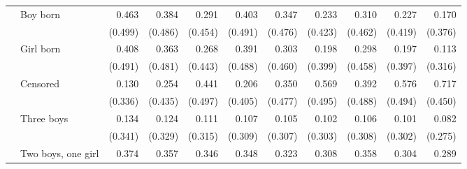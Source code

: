 \begin{table}
\begin{center}
\begin{scriptsize}
\begin{threeparttable}
\begin{tabular} {@{} c l D{.}{.}{1.3} D{.}{.}{1.3} D{.}{.}{1.3} D{.}{.}{1.3} D{.}{.}{1.3} D{.}{.}{1.3} D{.}{.}{1.3} D{.}{.}{1.3} D{.}{.}{1.3} @{}}
\addlinespace
\midrule
{}
                    & Boy born            &       0.463         &       0.384         &       0.291         &       0.403         &       0.347         &       0.233         &       0.310         &       0.227         &       0.170         \\
                    &                     &     (0.499)         &     (0.486)         &     (0.454)         &     (0.491)         &     (0.476)         &     (0.423)         &     (0.462)         &     (0.419)         &     (0.376)         \\
                    & Girl born           &       0.408         &       0.363         &       0.268         &       0.391         &       0.303         &       0.198         &       0.298         &       0.197         &       0.113         \\
                    &                     &     (0.491)         &     (0.481)         &     (0.443)         &     (0.488)         &     (0.460)         &     (0.399)         &     (0.458)         &     (0.397)         &     (0.316)         \\
                    & Censored            &       0.130         &       0.254         &       0.441         &       0.206         &       0.350         &       0.569         &       0.392         &       0.576         &       0.717         \\
                    &                     &     (0.336)         &     (0.435)         &     (0.497)         &     (0.405)         &     (0.477)         &     (0.495)         &     (0.488)         &     (0.494)         &     (0.450)         \\
                    & Three boys          &       0.134         &       0.124         &       0.111         &       0.107         &       0.105         &       0.102         &       0.106         &       0.101         &       0.082         \\
                    &                     &     (0.341)         &     (0.329)         &     (0.315)         &     (0.309)         &     (0.307)         &     (0.303)         &     (0.308)         &     (0.302)         &     (0.275)         \\
                    & Two boys, one girl  &       0.374         &       0.357         &       0.346         &       0.348         &       0.323         &       0.308         &       0.358         &       0.304         &       0.289         \\

\end{tabular}
\end{threeparttable}
\end{scriptsize}
\end{center}
\end{table}
